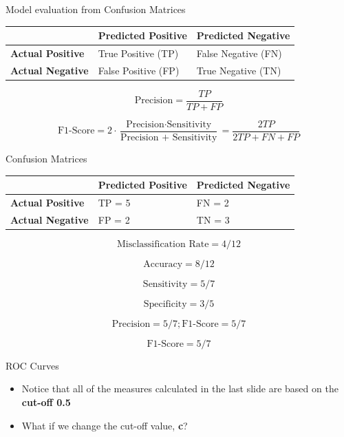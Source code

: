 \documentclass[
  ignorenonframetext,
]{beamer}
\begin{document}
\begin{frame}{Model evaluation from Confusion Matrices}
\protect\hypertarget{model-evaluation-from-confusion-matrices-1}{}

\begin{longtable}[]{@{}lll@{}}
\toprule
& Predicted Positive & Predicted Negative\tabularnewline
\midrule
\endhead
\textbf{Actual Positive} & True Positive (TP) & False Negative
(FN)\tabularnewline
\textbf{Actual Negative} & False Positive (FP) & True Negative
(TN)\tabularnewline
\bottomrule
\end{longtable}

\[
\text{Precision} = \frac{TP}{TP+FP} 
\]

\[
\text{F1-Score} =2\cdot  \frac{\text{Precision} \cdot \text{Sensitivity}}{\text{Precision + Sensitivity}} = \frac{2TP}{2TP+FN+FP}
\]

\end{frame}

\begin{frame}{Confusion Matrices}
\protect\hypertarget{confusion-matrices-3}{}

\begin{longtable}[]{@{}lll@{}}
\toprule
& Predicted Positive & Predicted Negative\tabularnewline
\midrule
\endhead
\textbf{Actual Positive} & TP = 5 & FN = 2\tabularnewline
\textbf{Actual Negative} & FP = 2 & TN = 3\tabularnewline
\bottomrule
\end{longtable}

\[
\text{Misclassification Rate} =4/12 
\]

\[
\text{Accuracy} = 8/12 
\]

\[
\text{Sensitivity} = 5/7 
\]

\[
\text{Specificity} = 3/5 
\]

\[
\text{Precision} = 5/7; 
\text{F1-Score} = 5/7
\]

\[
\text{F1-Score} = 5/7
\]

\end{frame}

\begin{frame}{ROC Curves}
\protect\hypertarget{roc-curves}{}

\begin{itemize}
\item
  Notice that all of the measures calculated in the last slide are based
  on the \textbf{cut-off 0.5}
\item
  What if we change the cut-off value, \textbf{c}?
\end{itemize}

\end{frame}
\end{document}
